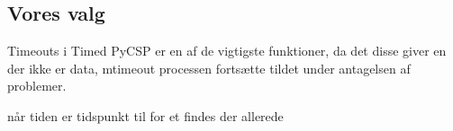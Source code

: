 \subsection{Vores valg} 

Timeouts i Timed PyCSP er en af de vigtigste funktioner, da det disse giver en
der ikke er data, mtimeout processen fortsætte  tildet under antagelsen af 
problemer.

når tiden er  tidspunkt
til for et findes der allerede  
